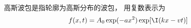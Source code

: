 

高斯波包是指轮廓为高斯分布的波包， 用复数表示为
\begin{equation}
f(x, t) = A_0 \exp(-ax^2)\exp[\I (k x - vt)]
\end{equation}
